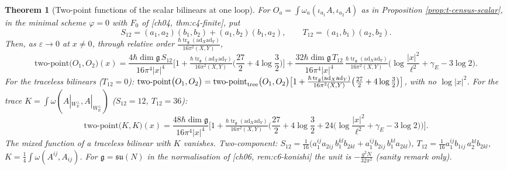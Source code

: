 \documentclass[11pt]{report}
\theoremstyle{plain}
\newtheorem{theorem}{Theorem}[chapter]
\theoremstyle{definition}
\numberwithin{equation}{chapter}
\newcommand{\unit}{\tfrac{\hbar\operatorname{tr}_{\mathfrak g}(\mathrm{ad}_X\mathrm{ad}_Y)}{16\pi^2(X,Y)}}
\newcommand{\Wp}{W_{\mathbb R}^\perp}
\newcommand{\TP}[2]{\mathrm{two\mbox{-}point}\big(#1,#2\big)}
\newcommand{\TPz}[2]{\mathrm{two\mbox{-}point}_{\rm tree}\big(#1,#2\big)}
\begin{document}
\begin{theorem}[Two-point functions of the scalar bilinears at one loop]
\label{thm:t-scalar}
For $O_a=\int\omega_a(\iota_{a_1}A,\iota_{a_2}A)$ as in Proposition \ref{prop:t-census-scalar}, in the minimal scheme $\varphi=0$ with $F_0$ of [ch04, thm:c4-finite], put
\[
S_{12}=(a_1,a_2)(b_1,b_2)+(a_1,b_2)(b_1,a_2),\qquad T_{12}=(a_1,b_1)(a_2,b_2).
\]
Then, as $\varepsilon\to0$ at $x\neq0$, through relative order $\unit$,
\begin{equation}
\TP{O_1}{O_2}(x)=\frac{4\hbar\dim\mathfrak g\,S_{12}}{16\pi^4|x|^4}\Big[1+\unit\Big(\frac{27}2+4\log\frac32\Big)\Big]+\frac{32\hbar\dim\mathfrak g\,T_{12}}{16\pi^4|x|^4}\,\unit\Big(\log\frac{|x|^2}{\ell^2}+\gamma_E-3\log2\Big).
\label{eq:t-result}
\end{equation}
For the traceless bilinears ($T_{12}=0$): $\TP{O_1}{O_2}=\TPz{O_1}{O_2}\big[1+\unit\big(\tfrac{27}2+4\log\tfrac32\big)\big]$, with no $\log|x|^2$. For the trace $K=\int\omega(A|_{\Wp},A|_{\Wp})$ ($S_{12}=12$, $T_{12}=36$):
\[
\TP{K}{K}(x)=\frac{48\hbar\dim\mathfrak g}{16\pi^4|x|^4}\Big[1+\unit\Big(\frac{27}2+4\log\frac32+24\Big(\log\frac{|x|^2}{\ell^2}+\gamma_E-3\log2\Big)\Big)\Big].
\]
The mixed function of a traceless bilinear with $K$ vanishes. Two-component: $S_{12}=\tfrac1{16}\big(a_1^{ij}a_{2ij}\,b_1^{kl}b_{2kl}+a_1^{ij}b_{2ij}\,b_1^{kl}a_{2kl}\big)$, $T_{12}=\tfrac1{16}a_1^{ij}b_{1ij}\,a_2^{kl}b_{2kl}$, $K=\tfrac14\int\omega(A^{ij},A_{ij})$. For $\mathfrak g=\mathfrak{su}(N)$ in the normalisation of [ch06, rem:c6-konishi] the unit is $-\tfrac{g^2N}{32\pi^2}$ (sanity remark only).
\end{theorem}
\end{document}
